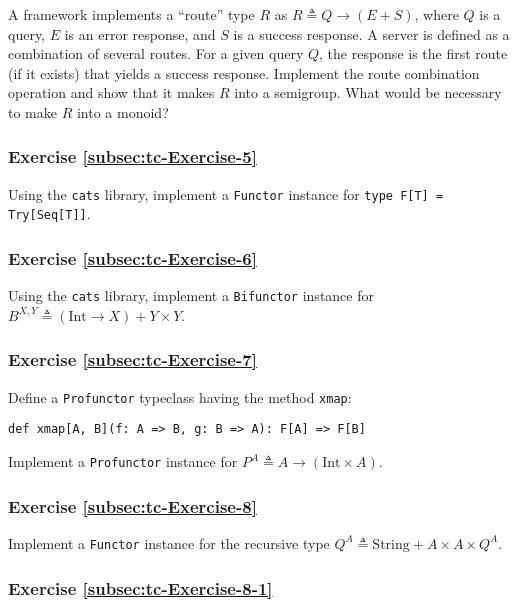 A framework implements a \textsf{``}route\textsf{''} type $R$ as $R\triangleq Q\rightarrow(E+S)$,
where $Q$ is a query, $E$ is an error response, and $S$ is a success
response. A server is defined as a combination of several routes.
For a given query $Q$, the response is the first route (if it exists)
that yields a success response. Implement the route combination operation
and show that it makes $R$ into a semigroup. What would be necessary
to make $R$ into a monoid?

\subsubsection{Exercise \label{subsec:tc-Exercise-5}\ref{subsec:tc-Exercise-5}}

Using the \texttt{cats} library, implement a \lstinline!Functor!
instance for \lstinline!type F[T] = Try[Seq[T]]!.

\subsubsection{Exercise \label{subsec:tc-Exercise-6}\ref{subsec:tc-Exercise-6}}

Using the \texttt{cats} library, implement a \lstinline!Bifunctor!
instance for $B^{X,Y}\triangleq\left(\text{Int}\rightarrow X\right)+Y\times Y$.

\subsubsection{Exercise \label{subsec:tc-Exercise-7}\ref{subsec:tc-Exercise-7}}

Define a \lstinline!Profunctor! typeclass having the method \lstinline!xmap!:

\begin{lstlisting}
def xmap[A, B](f: A => B, g: B => A): F[A] => F[B]
\end{lstlisting}
Implement a \lstinline!Profunctor! instance for $P^{A}\triangleq A\rightarrow\left(\text{Int}\times A\right)$.

\subsubsection{Exercise \label{subsec:tc-Exercise-8}\ref{subsec:tc-Exercise-8}}

Implement a \lstinline!Functor! instance for the recursive type $Q^{A}\triangleq\text{String}+A\times A\times Q^{A}$.

\subsubsection{Exercise \label{subsec:tc-Exercise-8-1}\ref{subsec:tc-Exercise-8-1}}


